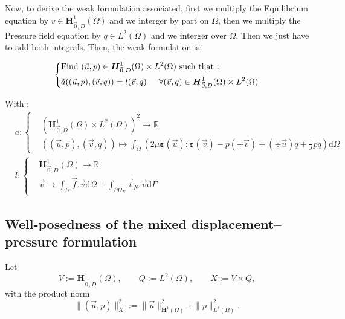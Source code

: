 \documentclass[a4paper,12pt,twoside]{report}
\newcommand{\mtr}{\mathbb{R}}
\newcommand{\dif}{\mathrm{d}}
\begin{document}
Now, to derive the weak formulation associated, first we multiply the Equilibrium equation by $v \in \boldsymbol H^1_{\vec 0,D}(\Omega)$ and we interger by part on $\Omega$, then we multiply the Pressure field equation by $q \in L^2(\Omega)$ and we interger over $\Omega$. Then we just have to add both integrals. 
Then, the weak formulation is: 
\begin{tcolorbox}
\begin{equation}
	\label{eq:weak_pressure_displ_form}
	\left\{
	\begin{aligned}
		&\text{Find } (\vec u,p) \in \boldsymbol H^1_{\vec 0,D}(\Omega) \times L^2(\Omega) \text{ such that :}\\
		& \tilde{a}((\vec u,p),(\vec v,q)) = l(\vec v,q) \hspace{0.5cm} \forall (\vec v,q) \in \boldsymbol H^1_{\vec 0,D}(\Omega) \times L^2(\Omega)
	\end{aligned}
	\right.
\end{equation}
\end{tcolorbox}

With : 
\begin{equation*}
	\begin{aligned}
		& \tilde{a} : \left\{
		\begin{aligned}
			&\left( \boldsymbol H^1_{\vec 0,D}(\Omega) \times L^2(\Omega) \right)^2 \rightarrow \mtr \\
			&((\vec u,p),(\vec v,q))  \longmapsto \int_\Omega \left( 2\mu \boldsymbol{\varepsilon}(\vec u) : \boldsymbol{\varepsilon}(\vec v) - p (\div \vec v) + (\div \vec u)q + \frac{1}{\lambda} pq \right) \dif \Omega
		\end{aligned}
		\right. \\
		& l : 
		\left\{
		\begin{aligned}
			&\boldsymbol H^1_{\vec 0,D}(\Omega) \rightarrow \mtr \\
			&\vec v \longmapsto \int_\Omega \vec f . \vec v \dif \Omega + \int_{\partial\Omega_N} \vec t_N.\vec v \dif \Gamma
		\end{aligned}
		\right.
	\end{aligned}
\end{equation*}


\subsection{Well-posedness of the mixed displacement–pressure formulation}

Let
\[
V:=\boldsymbol H^1_{\vec 0,D}(\Omega),\qquad Q:=L^2(\Omega),\qquad X:=V\times Q,
\]
with the product norm
\[
\|(\vec u,p)\|_X^2 := \|\vec u\|_{\boldsymbol H^1(\Omega)}^2 + \|p\|_{L^2(\Omega)}^2.
\]
\end{document}

